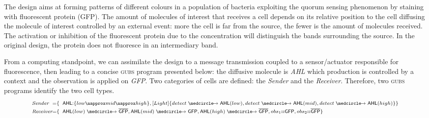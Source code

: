 \documentclass{eptcs}
\newcounter{ti}
\begin{document}
 The design aims at forming patterns of different colours in a population of bacteria exploiting the quorum sensing phenomenon by staining with fluorescent protein (GFP).
The amount of molecules of interest that receives a cell depends on its relative position to the cell diffusing the molecule of interest controlled by an external event: more the cell is far from the source, the fewer is the amount of molecules received. 
The activation or inhibition of the fluorescent protein due to the concentration will distinguish the bands surrounding the source. In the original design, the protein does not fluoresce in an intermediary band. 

From a computing standpoint, we can assimilate the design to a message transmission coupled to a sensor/actuator responsible for fluorescence, then leading to a concise \textsc{gubs} program presented below: the diffusive molecule is \textit{AHL} which production is controlled by a context and the observation is applied on \textit{GFP}. Two categories of cells are defined: the \emph{Sender} and the \emph{Receiver}. Therefore, two \textsc{gubs} programs identify the two cell types.
 \begin{equation*}
\scriptsize
\renewcommand{\arraystretch}{1.5}
\setlength{\doublerulesep}{\arrayrulewidth}
\begin{array}{l @{=} l} 
\textit{Sender} & \{\; \; \textsf{AHL:}\{low \napprox mid \napprox high \},
 \context{Light}\{detect\cause\textsf{AHL}(low),detect\cause\textsf{AHL}(mid),detect\cause\textsf{AHL}(high)\} \}\\
\textit{Receiver}&\{\; \; \textsf{AHL}(low)\cause \overline{\textsf{GFP}}, \textsf{AHL}(mid)\cause \textsf{GFP}, \textsf{AHL}(high)\cause \overline{\textsf{GFP}}, obs_1\textbf{::}\textsf{GFP}, obs_2 \textbf{::}\overline{\textsf{GFP}} \}
\end{array} 
\end{equation*}
\end{document}
